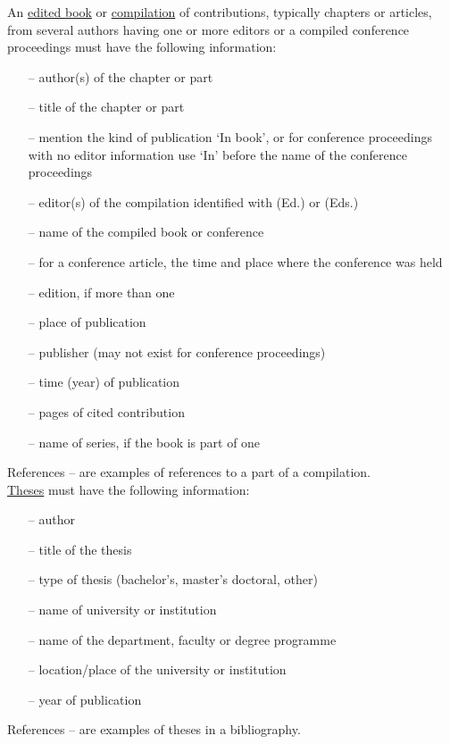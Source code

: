 \documentclass[english, 12pt, a4paper, biz, utf8, a-2b, online]{aaltothesis}
\begin{document}
\noindent
An \underline{edited book} or \underline{compilation} of contributions, 
typically chapters or articles, from several authors having one or more editors 
or a compiled conference proceedings must have the following information:
\begin{itemize}
\setlength{\itemsep}{-3pt}
\item[--]author(s) of the chapter or part
\item[--]title of the chapter or part
\item[--]mention the kind of publication `In book', or for conference 
proceedings with no editor information use `In' before the name of the 
conference proceedings
\item[--]editor(s) of the compilation identified with (Ed.) or (Eds.)
\item[--]name of the compiled book or conference
\item[--]for a conference article, the time and place where the conference was 
held
\item[--]edition, if more than one
\item[--]place of publication
\item[--]publisher (may not exist for conference proceedings)
\item[--]time (year) of publication
\item[--]pages of cited contribution
\item[--]name of series, if the book is part of one
\end{itemize}
References \cite{Sihvola}--\cite{Lindblom} are examples of references to a part 
of a compilation.\\

\noindent
\underline{Theses} must have the following information:
\begin{itemize}
\setlength{\itemsep}{-3pt}
\item[--]author
\item[--]title of the thesis
\item[--]type of thesis (bachelor's, master's doctoral, other)
\item[--]name of university or institution
\item[--]name of the department, faculty or degree programme
\item[--]location/place of the university or institution
\item[--]year of publication
\end{itemize}
References \cite{Miinusmaa}--\cite{Lonnqvist} are examples of theses in a 
bibliography.\\
\end{document}
